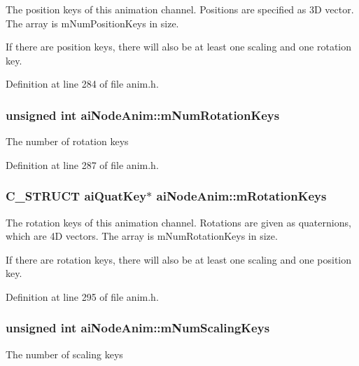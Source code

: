 The position keys of this animation channel. Positions are specified as 3D vector. The array is mNumPositionKeys in size.

If there are position keys, there will also be at least one scaling and one rotation key. 

Definition at line 284 of file anim.h.\hypertarget{structai_node_anim_ca7c78b89c4c64dcdf7619e105e0708c}{
\subsubsection[mNumRotationKeys]{\setlength{\rightskip}{0pt plus 5cm}unsigned int {\bf aiNodeAnim::mNumRotationKeys}}}
\label{structai_node_anim_ca7c78b89c4c64dcdf7619e105e0708c}


The number of rotation keys 

Definition at line 287 of file anim.h.\hypertarget{structai_node_anim_be1b0b8b0b30a3950cf09023868a07ac}{
\subsubsection[mRotationKeys]{\setlength{\rightskip}{0pt plus 5cm}C\_\-STRUCT {\bf aiQuatKey}$\ast$ {\bf aiNodeAnim::mRotationKeys}}}
\label{structai_node_anim_be1b0b8b0b30a3950cf09023868a07ac}


The rotation keys of this animation channel. Rotations are given as quaternions, which are 4D vectors. The array is mNumRotationKeys in size.

If there are rotation keys, there will also be at least one scaling and one position key. 

Definition at line 295 of file anim.h.\hypertarget{structai_node_anim_28fa0fd84571ac79cb45a537192738f6}{
\subsubsection[mNumScalingKeys]{\setlength{\rightskip}{0pt plus 5cm}unsigned int {\bf aiNodeAnim::mNumScalingKeys}}}
\label{structai_node_anim_28fa0fd84571ac79cb45a537192738f6}


The number of scaling keys 

